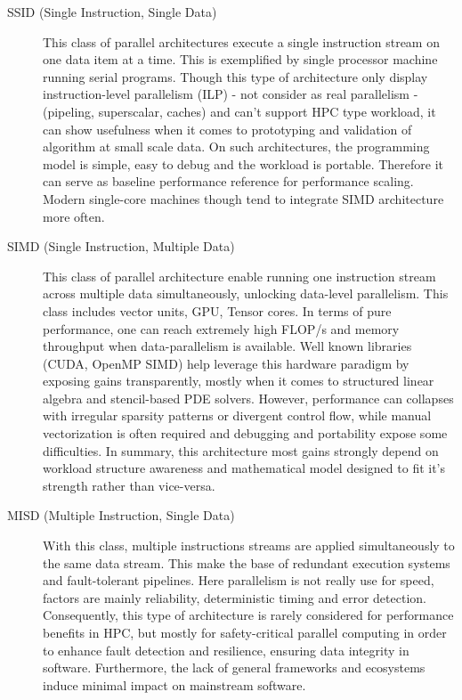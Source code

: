 \begin{description}

\item[SSID (Single Instruction, Single Data)] This class of parallel architectures execute a single instruction stream on one data item at a time. This is exemplified by single processor machine running serial programs. Though this type of architecture only display instruction-level parallelism (ILP) - not consider as real parallelism - (pipeling, superscalar, caches) and can't support HPC type workload, it can show usefulness when it comes to prototyping and validation of algorithm at small scale data. On such architectures, the programming model is simple, easy to debug and the workload is portable. Therefore it can serve as baseline performance reference for performance scaling. Modern single-core machines though tend to integrate SIMD architecture more often.

\item[SIMD (Single Instruction, Multiple Data)] This class of parallel architecture enable running one instruction stream across multiple data simultaneously, unlocking data-level parallelism. This class includes vector units, GPU, Tensor cores. In terms of pure performance, one can reach extremely high FLOP/s and memory throughput when data-parallelism is available. Well known libraries (CUDA, OpenMP SIMD) help leverage this hardware paradigm by exposing gains transparently, mostly when it comes to structured linear algebra and stencil-based PDE solvers. 
However, performance can collapses with irregular sparsity patterns or divergent control flow, while manual vectorization is often required and debugging and portability expose some difficulties. In summary, this architecture most gains strongly depend on workload structure awareness and mathematical model designed to fit it's strength rather than vice-versa. 



\item[MISD (Multiple Instruction, Single Data)] With this class, multiple instructions streams are applied simultaneously to the same data stream. This make the base of redundant execution systems and fault-tolerant pipelines. Here parallelism is not really use for speed, factors are mainly reliability, deterministic timing and error detection. Consequently, this type of architecture is rarely considered for performance benefits in HPC, but mostly for safety-critical parallel computing in order to enhance fault detection and resilience, ensuring data integrity in software. Furthermore, the lack of general frameworks and ecosystems induce minimal impact on mainstream software.





\end{description}
